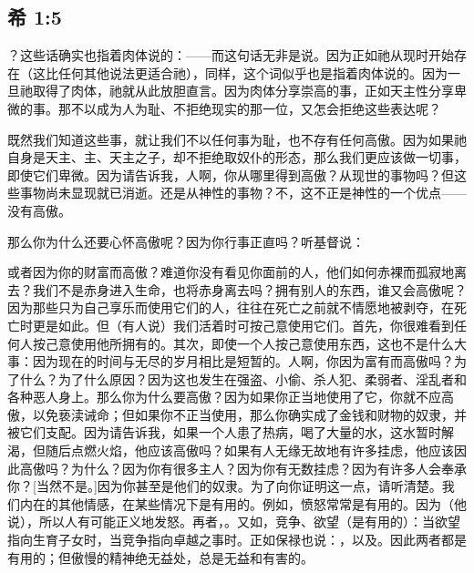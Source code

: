 
\subsection{希 1:5}

？这些话确实也指着肉体说的：——而这句话无非是说。因为正如祂从现时开始存在（这比任何其他说法更适合祂），同样，这个词似乎也是指着肉体说的。因为一旦祂取得了肉体，祂就从此放胆直言。因为肉体分享崇高的事，正如天主性分享卑微的事。那不以成为人为耻、不拒绝现实的那一位，又怎会拒绝这些表达呢？\par

既然我们知道这些事，就让我们不以任何事为耻，也不存有任何高傲。因为如果祂自身是天主、主、天主之子，却不拒绝取奴仆的形态，那么我们更应该做一切事，即使它们卑微。因为请告诉我，人啊，你从哪里得到高傲？从现世的事物吗？但这些事物尚未显现就已消逝。还是从神性的事物？不，这不正是神性的一个优点——没有高傲。\par

那么你为什么还要心怀高傲呢？因为你行事正直吗？听基督说：\par

或者因为你的财富而高傲？难道你没有看见你面前的人，他们如何赤裸而孤寂地离去？我们不是赤身进入生命，也将赤身离去吗？拥有别人的东西，谁又会高傲呢？因为那些只为自己享乐而使用它们的人，往往在死亡之前就不情愿地被剥夺，在死亡时更是如此。但（有人说）我们活着时可按己意使用它们。首先，你很难看到任何人按己意使用他所拥有的。其次，即使一个人按己意使用东西，这也不是什么大事：因为现在的时间与无尽的岁月相比是短暂的。人啊，你因为富有而高傲吗？为了什么？为了什么原因？因为这也发生在强盗、小偷、杀人犯、柔弱者、淫乱者和各种恶人身上。那么你为什么要高傲？因为如果你正当地使用了它，你就不应高傲，以免亵渎诫命；但如果你不正当使用，那么你确实成了金钱和财物的奴隶，并被它们支配。因为请告诉我，如果一个人患了热病，喝了大量的水，这水暂时解渴，但随后点燃火焰，他应该高傲吗？如果有人无缘无故地有许多挂虑，他应该因此高傲吗？为什么？因为你有很多主人？因为你有无数挂虑？因为有许多人会奉承你？[当然不是。]因为你甚至是他们的奴隶。为了向你证明这一点，请听清楚。我们内在的其他情感，在某些情况下是有用的。例如，愤怒常常是有用的。因为（他说），所以人有可能正义地发怒。再者，。又如，竞争、欲望（是有用的）：当欲望指向生育子女时，当竞争指向卓越之事时。正如保禄也说：，以及。因此两者都是有用的；但傲慢的精神绝无益处，总是无益和有害的。\par

